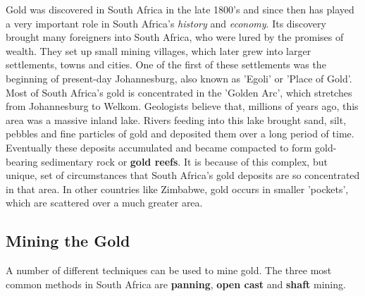 Gold was discovered in South Africa in the late 1800's and since then has played a very important role in South Africa's \emph{history} and \emph{economy}. Its discovery brought many foreigners into South Africa, who were lured by the promises of wealth. They set up small mining villages, which later grew into larger settlements, towns and cities. One of the first of these settlements was the beginning of present-day Johannesburg, also known as 'Egoli' or 'Place of Gold'.\\

Most of South Africa's gold is concentrated in the 'Golden Arc', which stretches from Johannesburg to Welkom. Geologists believe that, millions of years ago, this area was a massive inland lake. Rivers feeding into this lake brought sand, silt, pebbles and fine particles of gold and deposited them over a long period of time. Eventually these deposits accumulated and became compacted to form gold-bearing sedimentary rock or \textbf{gold reefs}. It is because of this complex, but unique, set of circumstances that South Africa's gold deposits are so concentrated in that area. In other countries like Zimbabwe, gold occurs in smaller 'pockets', which are scattered over a much greater area.

\subsection{Mining the Gold}

A number of different techniques can be used to mine gold. The three most common methods in South Africa are \textbf{panning}, \textbf{open cast} and \textbf{shaft} mining.

